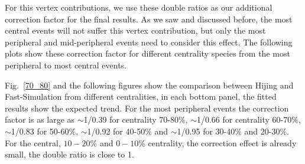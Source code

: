 \begin{figure}
\end{figure}

For this vertex contributions, we use these double ratios as our additional correction factor for the final results. As we saw and discussed before, the most central events will not suffer this vertex contribution, but only the most peripheral and mid-peripheral events need to consider this effect. The following plots show these correction factor for different centrality species from the most peripheral to most central events.


Fig.~\ref{70_80} and the following figures show the comparison between Hijing and Fast-Simulation from different centralities, in each bottom panel, the fitted results show the expected trend. For the most peripheral events the correction factor is as large as $\sim$1/0.39 for centrality 70-80\%, $\sim$1/0.66 for centrality 60-70\%, $\sim$1/0.83 for 50-60\%, $\sim$1/0.92 for 40-50\% and $\sim$1/0.95 for 30-40\% and 20-30\%. For the central, $10-20\%$ and $0-10\%$ centrality, the correction effect is already small, the double ratio is close to 1. $ $


